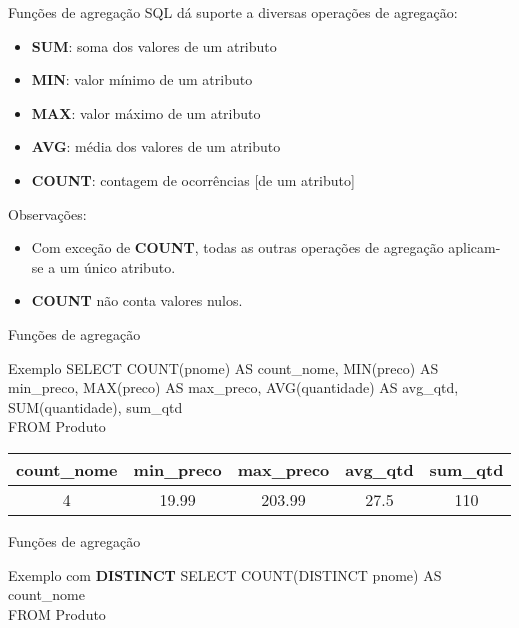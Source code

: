 \documentclass[aspectratio=169]{beamer}
\begin{document}
			\begin{frame}{Funções de agregação}
				\BlankLine\BlankLine
				SQL dá suporte a diversas operações de agregação:
				\begin{itemize}
					\item \textbf{SUM}: soma dos valores de um atributo
					\item \textbf{MIN}: valor mínimo de um atributo
					\item \textbf{MAX}: valor máximo de um atributo
					\item \textbf{AVG}: média dos valores de um atributo
					\item \textbf{COUNT}: contagem de ocorrências [de um atributo]
				\end{itemize}

				Observações:
				\begin{itemize}
					\item Com exceção de \textbf{COUNT}, todas as outras operações de agregação aplicam-se a um único atributo.
					\item \textbf{COUNT} não conta valores nulos.
				\end{itemize}			
			\end{frame}
		
			\begin{frame}{Funções de agregação}
				\begin{block}{Exemplo}
					{\ttfamily
						SELECT COUNT(pnome) AS count\_nome, MIN(preco) AS min\_preco, MAX(preco) AS max\_preco, AVG(quantidade) AS avg\_qtd, SUM(quantidade), sum\_qtd\\
						FROM Produto\\
					}
				\end{block}
				\begin{table}
					\begin{tabular}{|c|c|c|c|c|}
						\toprule
						\textbf{count\_nome} & \textbf{min\_preco} & \textbf{max\_preco} & \textbf{avg\_qtd} & \textbf{sum\_qtd} \\ \midrule
						         4           &        19.99        &       203.99        &       27.5        &        110        \\ \bottomrule
					\end{tabular}
				\end{table}
			\end{frame}
		
			\begin{frame}{Funções de agregação}
				\begin{block}{Exemplo com \textbf{DISTINCT}}
					{\ttfamily
						SELECT COUNT(DISTINCT pnome) AS count\_nome\\
						FROM Produto\\
					}
				\end{block}
			\end{frame}
		
\end{document}
